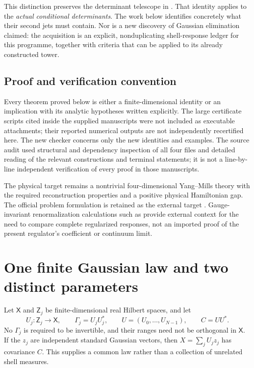 \documentclass[11pt,a4paper]{article}
\theoremstyle{definition}
\theoremstyle{remark}
\newcommand{\src}[2]{\cite[#2]{#1}}
\begin{document}
This distinction preserves the determinant telescope in
\src{YM3}{\texttt{eq:det-telescope}}. That identity applies to the
\emph{actual conditional determinants}. The work below identifies
concretely what their second jets must contain. Nor is a new discovery
of Gaussian elimination claimed: the acquisition is an explicit,
nonduplicating shell-response ledger for this programme, together with
criteria that can be applied to its already constructed tower.

\subsection{Proof and verification convention}
Every theorem proved below is either a finite-dimensional identity or an
implication with its analytic hypotheses written explicitly. The large
certificate scripts cited inside the supplied manuscripts were not
included as executable attachments; their reported numerical outputs
are not independently recertified here. The new checker concerns only
the new identities and examples. The source audit used structural and
dependency inspection of all four files and detailed reading of the
relevant constructions and terminal statements; it is not a line-by-line
independent verification of every proof in those manuscripts.

The physical target remains a nontrivial four-dimensional Yang--Mills
theory with the required reconstruction properties and a positive
physical Hamiltonian gap. The official problem formulation is retained
as the external target \cite{Clay}. Gauge-invariant renormalization
calculations such as \cite{Morris,AGM} provide external context for the
need to compare complete regularized responses, not an imported proof
of the present regulator's coefficient or continuum limit.

\section{One finite Gaussian law and two distinct parameters}
\label{sec:v1-finite}

Let $\mathsf X$ and $\mathsf Z_j$ be finite-dimensional real Hilbert
spaces, and let
\[
 U_j:\mathsf Z_j\longrightarrow\mathsf X,
 \qquad \Gamma_j=U_jU_j^*,\qquad
 U=(U_0,\ldots,U_{N-1}),\qquad C=UU^*.
\]
No $\Gamma_j$ is required to be invertible, and their ranges need not be
orthogonal in $\mathsf X$. If the $z_j$ are independent standard Gaussian
vectors, then $X=\sum_jU_jz_j$ has covariance $C$. This supplies a common
law rather than a collection of unrelated shell measures.
\end{document}
